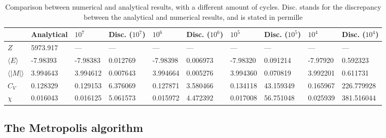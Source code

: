 \documentclass[a4paper]{article}
\let\Oldsubsection\subsection
\renewcommand{\subsection}{\FloatBarrier\Oldsubsection}
\begin{document}
\begin{table}[!htb]
	\centering
	\begin{tabular}{|l|l|l|l|l|l|l|l|l|l|}
		\hline
		& Analytical       	  & $10^7$ & Disc. ($10^7$) 
		& $10^6$ & Disc. ($10^6$) & $10^5$ &  Disc. ($10^5$) 
		& $10^4$ & Disc. ($10^4$) \\ \hline
		$Z$ & 5973.917  &	--- & ---  &	--- & --- &	--- & ---  &	--- & --- \\ \hline
		$\langle E \rangle$ & -7.98393 & -7.98383 & 0.012769 & -7.98398 & 0.006973 & -7.98320 & 0.091214 & -7.97920 & 0.592323 \\ \hline
		$\langle|M|\rangle$ & 3.994643 & 3.994612 & 0.007643  & 3.994664 & 0.005276 & 3.994360 & 0.070819 & 3.992201 & 0.611731 \\ \hline
		$C_V$ & 0.128329 & 0.129153 & 6.376069 & 0.127871 & 3.580466 & 0.134118 & 43.159349 & 0.165967 & 226.779928 \\ \hline
		$\chi$ & 0.016043 & 0.016125 & 5.061573  & 0.015972 & 4.472392 & 0.017008 & 56.751048 & 0.025939 & 381.516044  \\ \hline
	\end{tabular}
	\caption{Comparison between numerical and analytical results, with a different amount of cycles. Disc. stands for the discrepancy between the analytical and numerical results, and is stated in permille}%
	\label{tab:oppb}
\end{table}


\subsection{The Metropolis algorithm}
\end{document}
